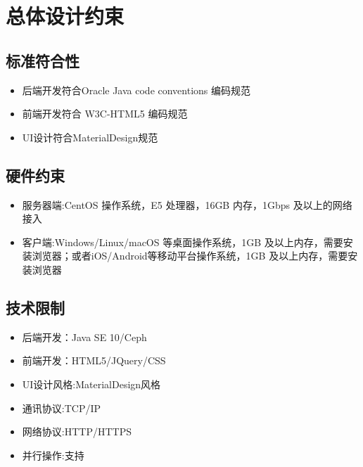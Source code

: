 \chapter{总体设计约束}
 
\section{标准符合性}
\begin{itemize}
  \item 后端开发符合Oracle Java code conventions 编码规范
  \item 前端开发符合 W3C-HTML5 编码规范
  \item UI设计符合MaterialDesign规范
\end{itemize}

\section{硬件约束}
\begin{itemize}
  \item 服务器端:CentOS 操作系统，E5 处理器，16GB 内存，1Gbps 及以上的网络接入 
  \item 客户端:Windows/Linux/macOS 等桌面操作系统，1GB 及以上内存，需要安装浏览器；或者iOS/Android等移动平台操作系统，1GB 及以上内存，需要安装浏览器
\end{itemize}

\section{技术限制}
\begin{itemize}
  \item 后端开发：Java SE 10/Ceph
  \item 前端开发：HTML5/JQuery/CSS
  \item UI设计风格:MaterialDesign风格
  \item 通讯协议:TCP/IP
  \item 网络协议:HTTP/HTTPS
  \item 并行操作:支持
\end{itemize}